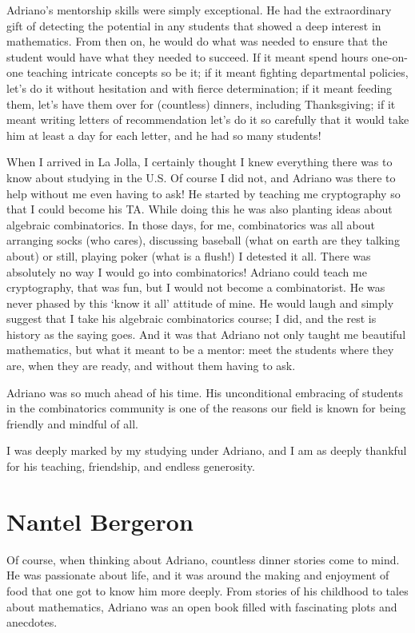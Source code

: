 \documentclass{notices}
\begin{document}
Adriano's mentorship skills were simply exceptional.  He had the extraordinary gift of detecting the potential in any students that showed a deep interest in mathematics. From then on, he would do what was needed to ensure that the student would have what they needed to succeed. If it meant spend hours one-on-one teaching intricate concepts so be it; if it meant fighting  departmental policies, let's do it without hesitation and with fierce determination; if it meant feeding them, let's have them over for (countless) dinners, including Thanksgiving; if it meant writing letters of recommendation let's do it so carefully that it would take him at least a day for each letter, and he had so many students!

When I arrived in La Jolla, I certainly thought I knew everything there was to know about studying in the U.S. Of course I did not, and Adriano was there to help without me even having to ask!   He started by teaching me cryptography so that I could become his TA. While doing this he was also planting ideas about algebraic combinatorics. In those days, for me, combinatorics was all about arranging socks (who cares), discussing baseball (what on earth are they talking about) or still, playing poker (what is a flush!) I detested it all. There was absolutely no way I would go into combinatorics! Adriano could teach me cryptography, that was fun, but I would not become a combinatorist. He was never phased by this `know it all' attitude of mine. He would laugh and simply suggest that I take his algebraic combinatorics course; I did, and the rest is history as the saying goes. And it was that Adriano not only taught me beautiful mathematics, but what it meant to be a mentor: meet the students where they are, when they are ready, and without them having to ask.

Adriano was so much ahead of his time. His unconditional embracing of students in the combinatorics community is one of the reasons our field is known for being friendly and mindful of all.

I was deeply marked by my studying under Adriano, and I am as deeply thankful for his teaching, friendship, and endless generosity. 

\section*{Nantel Bergeron}
Of course, when thinking about Adriano, countless dinner stories come to mind. He was passionate about life, and it was around the making and enjoyment of food that one got to know him more deeply. From stories of his childhood to tales about mathematics, Adriano was an open book filled with fascinating plots and anecdotes.
\end{document}
